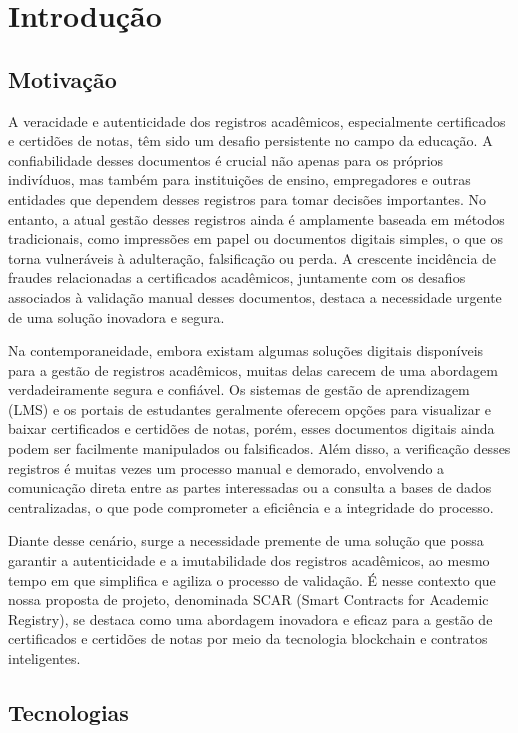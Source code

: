 \documentclass[10pt]{article}
\begin{document}
\section{Introdução}

\subsection*{Motivação}

A veracidade e autenticidade dos registros acadêmicos, especialmente certificados e certidões de notas,
têm sido um desafio persistente no campo da educação. A confiabilidade desses documentos é crucial não apenas
para os próprios indivíduos, mas também para instituições de ensino, empregadores e outras entidades que
dependem desses registros para tomar decisões importantes. No entanto, a atual gestão desses registros
ainda é amplamente baseada em métodos tradicionais, como impressões em papel ou documentos digitais simples, o que os torna vulneráveis à adulteração, falsificação ou perda. A crescente incidência de fraudes relacionadas a certificados acadêmicos, juntamente com os desafios associados à validação manual desses documentos, destaca a necessidade urgente de uma solução inovadora e segura.

Na contemporaneidade, embora existam algumas soluções digitais disponíveis para a gestão de registros acadêmicos, muitas delas carecem de uma abordagem verdadeiramente segura e confiável. Os sistemas de gestão de aprendizagem (LMS) e os portais de estudantes geralmente oferecem opções para visualizar e baixar certificados e certidões de notas, porém, esses documentos digitais ainda podem ser facilmente manipulados ou falsificados. Além disso, a verificação desses registros é muitas vezes um processo manual e demorado, envolvendo a comunicação direta entre as partes interessadas ou a consulta a bases de dados centralizadas, o que pode comprometer a eficiência e a integridade do processo.

Diante desse cenário, surge a necessidade premente de uma solução que possa garantir a autenticidade e a imutabilidade dos registros acadêmicos, ao mesmo tempo em que simplifica e agiliza o processo de validação. É nesse contexto que nossa proposta de projeto, denominada SCAR (Smart Contracts for Academic Registry), se destaca como uma abordagem inovadora e eficaz para a gestão de certificados e certidões de notas por meio da tecnologia blockchain e contratos inteligentes.

\subsection*{Tecnologias}
\end{document}
